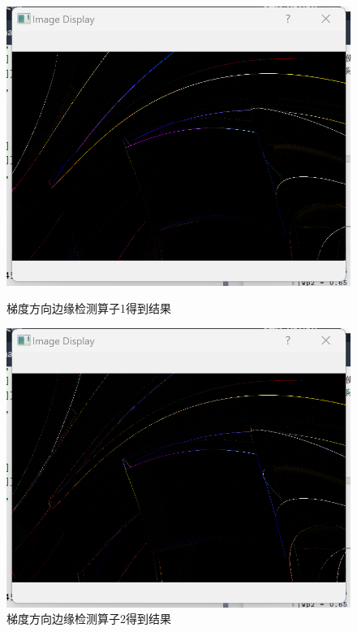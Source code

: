 \documentclass[a4paper,12pt]{article}
\begin{document}
\begin{figure}[htbp]
    \centering
    \begin{minipage}[b]{0.48\textwidth}
        \centering
        \includegraphics[width=\linewidth]{images/Design/image_processing/1/gradient5.png}
        \caption{梯度方向边缘检测算子1得到结果}
    \end{minipage}
    \hfill
    \begin{minipage}[b]{0.48\textwidth}
        \centering
        \includegraphics[width=\linewidth]{images/Design/image_processing/1/gradient6.png}
        \caption{梯度方向边缘检测算子2得到结果}
    \end{minipage}
    

\end{figure}
\end{document}
